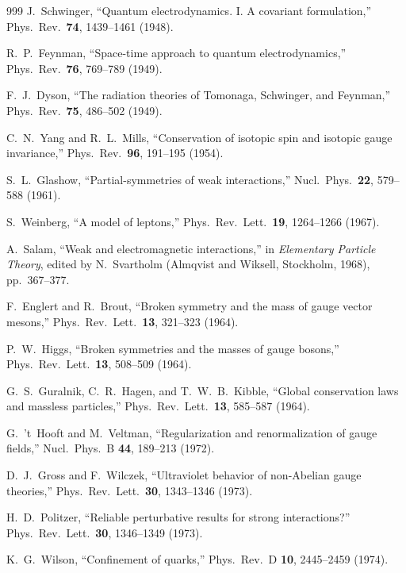 \begin{thebibliography}{999}
J.~Schwinger,
``Quantum electrodynamics. I. A covariant formulation,''
Phys.\ Rev.\ \textbf{74}, 1439--1461 (1948).

R.~P.~Feynman,
``Space-time approach to quantum electrodynamics,''
Phys.\ Rev.\ \textbf{76}, 769--789 (1949).

F.~J.~Dyson,
``The radiation theories of Tomonaga, Schwinger, and Feynman,''
Phys.\ Rev.\ \textbf{75}, 486--502 (1949).

C.~N.~Yang and R.~L.~Mills,
``Conservation of isotopic spin and isotopic gauge invariance,''
Phys.\ Rev.\ \textbf{96}, 191--195 (1954).

S.~L.~Glashow,
``Partial-symmetries of weak interactions,''
Nucl.\ Phys.\ \textbf{22}, 579--588 (1961).

S.~Weinberg,
``A model of leptons,'' Phys.\ Rev.\ Lett.\ \textbf{19}, 1264--1266 (1967).

A.~Salam,
``Weak and electromagnetic interactions,'' in
\emph{Elementary Particle Theory}, edited by N.~Svartholm
(Almqvist and Wiksell, Stockholm, 1968), pp.~367--377.

F.~Englert and R.~Brout,
``Broken symmetry and the mass of gauge vector mesons,''
Phys.\ Rev.\ Lett.\ \textbf{13}, 321--323 (1964).

P.~W.~Higgs,
``Broken symmetries and the masses of gauge bosons,''
Phys.\ Rev.\ Lett.\ \textbf{13}, 508--509 (1964).

G.~S.~Guralnik, C.~R.~Hagen, and T.~W.~B.~Kibble,
``Global conservation laws and massless particles,''
Phys.\ Rev.\ Lett.\ \textbf{13}, 585--587 (1964).

G.~'t~Hooft and M.~Veltman,
``Regularization and renormalization of gauge fields,''
Nucl.\ Phys.\ B \textbf{44}, 189--213 (1972).

D.~J.~Gross and F.~Wilczek,
``Ultraviolet behavior of non-Abelian gauge theories,''
Phys.\ Rev.\ Lett.\ \textbf{30}, 1343--1346 (1973).

H.~D.~Politzer,
``Reliable perturbative results for strong interactions?''
Phys.\ Rev.\ Lett.\ \textbf{30}, 1346--1349 (1973).

K.~G.~Wilson,
``Confinement of quarks,'' Phys.\ Rev.\ D \textbf{10}, 2445--2459 (1974).


\end{thebibliography}
